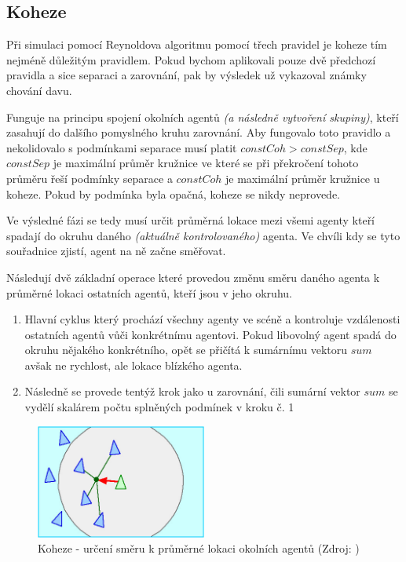 \documentclass[czech,public,dept460,male,cpdeclaration]{diploma}
\begin{document}
\subsection{Koheze}\label{sec:koheze}
Při simulaci pomocí Reynoldova algoritmu pomocí třech pravidel je koheze tím nejméně důležitým pravidlem. Pokud bychom aplikovali pouze dvě předchozí pravidla a sice separaci a zarovnání, pak by výsledek už vykazoval známky chování davu.

Funguje na principu spojení okolních agentů \textit{(a následně vytvoření skupiny)}, kteří zasahují do dalšího pomyslného kruhu zarovnání. Aby fungovalo toto pravidlo a nekolidovalo s podmínkami separace musí platit \(constCoh > constSep\), kde \(constSep\) je maximální průměr kružnice ve které se při překročení tohoto průměru řeší podmínky separace a \(constCoh\) je maximální průměr kružnice u koheze. Pokud by podmínka byla opačná, koheze se nikdy neprovede.

Ve výsledné fázi se tedy musí určit průměrná lokace mezi všemi agenty kteří spadají do okruhu daného \textit{(aktuálně kontrolovaného)} agenta. Ve chvíli kdy se tyto souřadnice zjistí, agent na ně začne směřovat.

Následují dvě základní operace které provedou změnu směru daného agenta k průměrné lokaci ostatních agentů, kteří jsou v jeho okruhu.

\begin{enumerate}
	\item Hlavní cyklus který prochází všechny agenty ve scéně a kontroluje vzdálenosti ostatních agentů vůči konkrétnímu agentovi. Pokud libovolný agent spadá do okruhu nějakého konkrétního, opět se přičítá k sumárnímu vektoru \(sum\) avšak ne rychlost, ale lokace blízkého agenta.
	\item Následně se provede tentýž krok jako u zarovnání, čili sumární vektor \(sum\) se vydělí skalárem počtu splněných podmínek v kroku č. 1
	
\end{enumerate}

\begin{figure}[H]\centering\includegraphics[width=0.5\textwidth]{Figures/cohesion.jpg}
	\caption{Koheze - určení směru k průměrné lokaci okolních agentů (Zdroj: \cite{link2})}
\end{figure}
\end{document}
